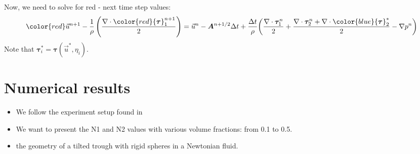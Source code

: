 Now, we need to solve for red - next time step values:
\[
{\color{red}\vec{u}^{n+1}} 
-\frac{1}{\rho} 
\left(
\frac{\nabla \cdot {\color{red}{\bm \tau}_1^{n+1}}}{2}
\right)
=
\vec{u}^n 
 -{\bm A}^{n+1/2} \Delta t
 +\frac{\Delta t}{\rho}  \biggl(
\frac{ \nabla \cdot{\bm \tau}_1^n}{2} 
+ \frac{\nabla \cdot {\bm \tau}_2^{n} + \nabla \cdot {\color{blue}{\bm \tau}_2^*}}{2} 
- \nabla p^n
\biggr)
\]
Note that ${\bm \tau}_i^* = {\bm \tau}(\vec{u}^*, \eta_i)$.






\section{Numerical results}
\begin{itemize}
  \item We follow the experiment setup found in \cite{couturier_suspensions_2011}
  \item We want to present the N1 and N2 values with various volume fractions: from 0.1 to 0.5.
  \item the geometry of a tilted trough with rigid spheres in a Newtonian fluid. 
\end{itemize}

